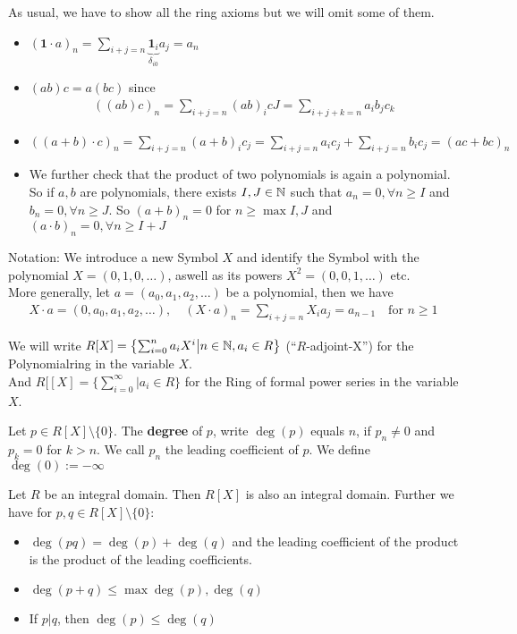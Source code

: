 As usual, we have to show all the ring axioms but we will omit some of them.
\begin{itemize}
\item $(\bm{1} \cdot a)_n = \sum_{i+j = n} \underbrace{\bm{1}_i}_{\delta_{i0}} a_j = a_n$
\item $(ab)c = a(bc)$ since
                \begin{align*}
                                                ((ab)c)_n = \sum_{i+j=n}(ab)_icJ = \sum_{i+j+k = n} a_ib_jc_k
                \end{align*}
\item $((a+b) \cdot c)_n = \sum_{i+j=n} (a+b)_ic_j = \sum_{i+j=n} a_i c_j + \sum_{i+j=n}b_ic_j = (ac + bc)_n$
\item   We further check that the product of two polynomials is again a polynomial. So if $a,b$ are polynomials, there exists $I,J \in \mathbb{N}$ such that $a_n = 0, \forall n \geq I$ and $b_n = 0, \forall n \geq J$. So $(a+b)_n = 0$ for $n \geq \max{I,J}$ and $(a \cdot b)_n = 0, \forall n \geq I + J$
\end{itemize}
Notation: We introduce a new Symbol $X$ and identify the Symbol with the polynomial $X = (0,1,0, \ldots)$, aswell as its powers $X^2 = (0, 0, 1, \ldots)$ etc.\\
More generally, let $a = (a_0, a_1, a_2, \ldots)$ be a polynomial, then we have
\begin{align*}
                                X \cdot a = (0, a_0, a_1, a_2, \ldots), \quad (X \cdot a)_n = \sum_{i+j=n}X_ia_j = a_{n-1} \quad \text{for } n \geq 1
\end{align*}


We will write $R[X] = \left\{\sum_{i=0}^{n}a_i X^i \big\vert n \in \mathbb{N}, a_i \in R\right\}$ (``$R$-adjoint-X'') for the Polynomialring in the variable $X$.\\
And $R[[X] = \{\sum_{i=0}^{\infty} \big\vert a_i \in R\}$ for the Ring of formal power series in the variable $X$.



\begin{definition}[Degree]
                                Let $p \in R[X] \setminus\{0\}$. The \textbf{degree} of $p$, write $\deg(p)$ equals $n$, if $p_n \neq 0$ and $p_k = 0$ for $k > n$. We call $p_n$ the leading coefficient of $p$. We define $\deg(0) := -\infty$
\end{definition}


\begin{proposition}[]
                                Let $R$ be an integral domain. Then $R[X]$ is also an integral domain.
Further we have for $p,q \in R[X] \setminus \{0\}$:
\begin{itemize}
\item   $\deg(pq) = \deg(p) + \deg(q)$ and the leading coefficient of the product is the product of the leading coefficients.
\item   $\deg(p+q) \leq \max{\deg(p), \deg(q)}$
\item   If $p|q$, then $\deg(p) \leq \deg(q)$
\end{itemize}
\end{proposition}


